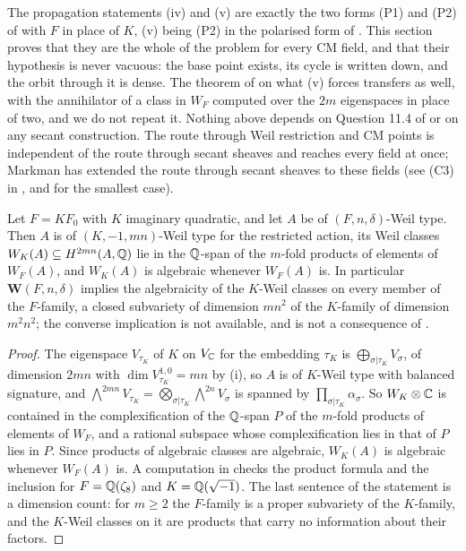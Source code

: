 \begin{remark}\label{rem:cmwhatisnew}
The propagation statements (iv) and (v) are exactly the two forms (P1) and
(P2) of  with $F$ in place of $K$, (v) being (P2) in the
polarised form of . This section proves that they are the
whole of the problem for every CM field, and that their hypothesis is never
vacuous: the base point exists, its cycle is written down, and the orbit
through it is dense. The theorem of  on what (v) forces
transfers as well, with the annihilator of a class in $W_{F}$ computed over
the $2m$ eigenspaces in place of two, and we do not repeat it. Nothing above
depends on Question 11.4 of \cite{Mar25b} or on any secant construction. The
route through Weil restriction and CM points is independent of the route
through secant sheaves and reaches every field at once; Markman has extended
the route through secant sheaves to these fields \cite{Mar25c} (see (C3) in
, and  for the smallest case).
\end{remark}

\begin{proposition}\label{prop:composite}
Let $F=KF_{0}$ with $K$ imaginary quadratic, and let $A$ be of
$(F,n,\delta)$-Weil type. Then $A$ is of $(K,-1,mn)$-Weil type for the
restricted action, its Weil classes $W_{K}(A)\subseteq H^{2mn}(A,\mathbb{Q})$ lie in
the $\mathbb{Q}$-span of the $m$-fold products of elements of $W_{F}(A)$, and
$W_{K}(A)$ is algebraic whenever $W_{F}(A)$ is. In particular
$\mathbf{W}(F,n,\delta)$ implies the algebraicity of the $K$-Weil classes on
every member of the $F$-family, a closed subvariety of dimension $mn^{2}$ of
the $K$-family of dimension $m^{2}n^{2}$; the converse implication is not
available, and  is not a consequence of
.
\end{proposition}

\begin{proof}
The eigenspace $V_{\tau_{K}}$ of $K$ on $V_{\mathbb{C}}$ for the embedding
$\tau_{K}$ is $\bigoplus_{\sigma|\tau_{K}}V_{\sigma}$, of dimension $2mn$
with $\dim V_{\tau_{K}}^{1,0}=mn$ by (i), so $A$ is of
$K$-Weil type with balanced signature, and
$\bigwedge^{2mn}V_{\tau_{K}}=\bigotimes_{\sigma|\tau_{K}}\bigwedge^{2n}V_{\sigma}$
is spanned by $\prod_{\sigma|\tau_{K}}\alpha_{\sigma}$. So
$W_{K}\otimes\mathbb{C}$ is contained in the complexification of the $\mathbb{Q}$-span $P$ of
the $m$-fold products of elements of $W_{F}$, and a rational subspace whose
complexification lies in that of $P$ lies in $P$. Since products of
algebraic classes are algebraic, $W_{K}(A)$ is algebraic whenever $W_{F}(A)$
is. A computation in \cite{BMB26} checks the
product formula and the inclusion for $F=\mathbb{Q}(\zeta_{8})$ and
$K=\mathbb{Q}(\sqrt{-1})$. The last sentence of the statement is a dimension count:
for $m\ge2$ the $F$-family is a proper subvariety of the $K$-family, and the
$K$-Weil classes on it are products that carry no information about their
factors.
\end{proof}


